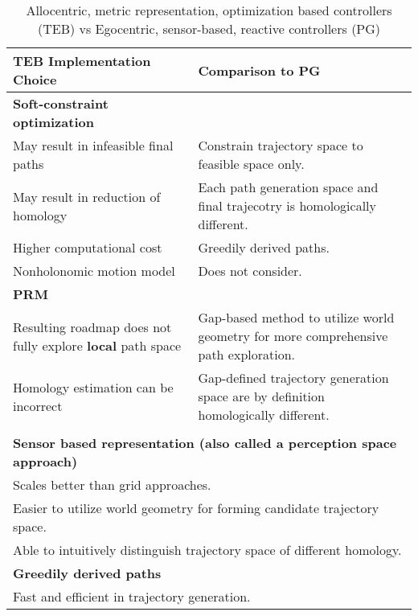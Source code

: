 \documentclass[letterpaper, 10pt]{article}
\begin{document}
    \begin{table}[]
        \caption{Allocentric, metric representation, optimization based controllers (TEB) vs Egocentric, sensor-based, reactive controllers (PG)}
        \vspace{6pt}
        \centering
        \label{tab:my-table}
        \begin{tabular}{|m{7cm}|m{7.5cm}|}
        \hline
        \bf TEB Implementation Choice & \bf Comparison to PG \\ \hline
        \multicolumn{1}{|l|}{\bf Soft-constraint optimization} & \\ \hline
        \quad May result in infeasible final paths & Constrain trajectory space to feasible space only.\\ \hline
        \quad May result in reduction of homology & Each path generation space and final trajecotry is homologically different.\\ \hline
        \quad Higher computational cost & Greedily derived paths. \\ \hline
        \quad Nonholonomic motion model & Does not consider.  \\ \hline
        \multicolumn{1}{|l|}{\bf PRM} & \\ \hline
        \quad Resulting roadmap does not fully explore {\bf local} path space & 
        Gap-based method to utilize world geometry for more comprehensive path exploration. \\ \hline
        \quad Homology estimation can be incorrect & Gap-defined trajectory generation space are by definition homologically different. \\ \hhline{|=|=|}
        \multicolumn{2}{|l|}{\bf PG Implementation Choice} \\ \hline
        \multicolumn{2}{|l|}{\bf Sensor based representation (also called a perception space approach)}\\ \hline
        \multicolumn{2}{|l|}{\quad Scales better than grid approaches.} \\ \hline
        \multicolumn{2}{|l|}{\quad Easier to utilize world geometry for forming candidate trajectory space.} \\ \hline
        \multicolumn{2}{|l|}{\quad Able to intuitively distinguish trajectory space of different homology.} \\ \hline
        \multicolumn{2}{|l|}{\bf Greedily derived paths} \\ \hline
        \multicolumn{2}{|l|}{\quad Fast and efficient in trajectory generation.} \\ \hline
        \end{tabular}
    \end{table}
\end{document}
